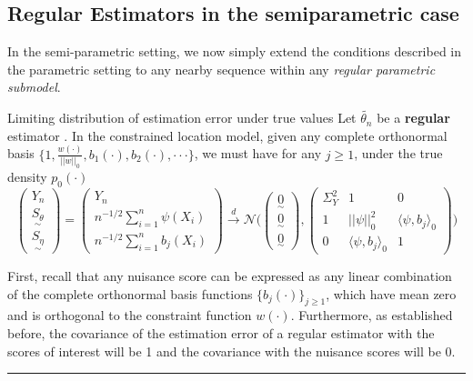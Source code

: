 \documentclass[twoside]{article}
\newenvironment{proof}{{\bf Proof:}}{\hfill\rule{2mm}{2mm}}
\newcommand{\utilde}{\underset{\sim}}
\begin{document}
\subsection{Regular Estimators in the semiparametric case}
In the semi-parametric setting, we now simply extend the conditions described in the parametric setting to any nearby sequence within any \textit{regular parametric submodel}.

\begin{proposition_exam}{Limiting distribution of estimation error under true values}{} Let $\tilde{\theta_{n}}$ be a \textbf{regular} estimator . In the constrained location model, given any complete orthonormal basis $\{1, \frac{w(\cdot)}{||w||_0}, b_1(\cdot), b_2(\cdot), \cdot \cdot \cdot \}$, we must have for any $j \geq 1$, under the true density $p_0(\cdot)$
\begin{equation}
\begin{pmatrix}
Y_{n}\\
\utilde{S_{\theta}}\\
\utilde{S_{\eta}}
\end{pmatrix} = 
\begin{pmatrix}
Y_n \\ 
n^{-1/2}\sum_{i=1}^{n}\psi(X_i)\\
n^{-1/2}\sum_{i=1}^{n}b_j(X_i)
\end{pmatrix} 
\xrightarrow{d}
\mathcal{N}
\bigg( 
\begin{pmatrix}  
\utilde{0}\\
\utilde{0}\\
\utilde{0}
\end{pmatrix} , 
\begin{pmatrix}
\Sigma_{Y}^{2} & 1 & 0\\
1 & ||\psi||_{0}^{2} & \langle \psi, b_j \rangle_{0}\\
0 & \langle \psi, b_j \rangle_{0} & 1
\end{pmatrix}
\bigg)
\end{equation}
\end{proposition_exam}

\begin{proof}
First, recall that any nuisance score can be expressed as any linear combination of the complete orthonormal basis functions $\{b_j(\cdot)\}_{j \geq 1}$, which have mean zero and is orthogonal to the constraint function $w(\cdot).$ Furthermore, as established before, the covariance of the estimation error of a regular estimator with the scores of interest will be 1 and the covariance with the nuisance scores will be 0.
\end{proof}
\end{document}
